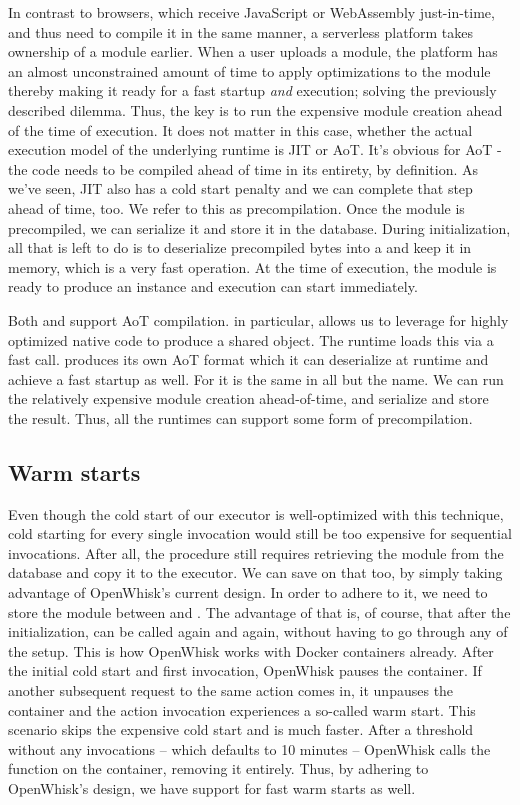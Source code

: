 In contrast to browsers, which receive JavaScript or WebAssembly just-in-time, and thus need to compile it in the same manner, a serverless platform takes ownership of a module earlier. When a user uploads a module, the platform has an almost unconstrained amount of time to apply optimizations to the module thereby making it ready for a fast startup \emph{and} execution; solving the previously described dilemma. Thus, the key is to run the expensive module creation ahead of the time of execution. It does not matter in this case, whether the actual execution model of the underlying runtime is JIT or AoT. It's obvious for AoT - the code needs to be compiled ahead of time in its entirety, by definition. As we've seen, JIT also has a cold start penalty and we can complete that step ahead of time, too. We refer to this as precompilation. Once the module is precompiled, we can serialize it and store it in the database. During initialization, all that is left to do is to deserialize precompiled bytes into a  and keep it in memory, which is a very fast operation. At the time of execution, the module is ready to produce an instance and execution can start immediately.

Both  and  support AoT compilation.  in particular, allows us to leverage  for highly optimized native code to produce a shared object. The runtime loads this via a fast  call.  produces its own AoT format which it can deserialize at runtime and achieve a fast startup as well. For  it is the same in all but the name. We can run the relatively expensive module creation ahead-of-time, and serialize and store the result. Thus, all the runtimes can support some form of precompilation.

\subsection{Warm starts}

Even though the cold start of our executor is well-optimized with this technique, cold starting for every single invocation would still be too expensive for sequential invocations. After all, the  procedure still requires retrieving the module from the database and copy it to the executor. We can save on that too, by simply taking advantage of OpenWhisk's current design. In order to adhere to it, we need to store the module between  and . The advantage of that is, of course, that after the initialization,  can be called again and again, without having to go through any of the setup. This is how OpenWhisk works with Docker containers already. After the initial cold start and first invocation, OpenWhisk pauses the container. If another subsequent request to the same action comes in, it unpauses the container and the action invocation experiences a so-called warm start. This scenario skips the expensive cold start and is much faster. After a threshold without any invocations -- which defaults to 10 minutes -- OpenWhisk calls the  function on the container, removing it entirely.
Thus, by adhering to OpenWhisk's design, we have support for fast warm starts as well.

